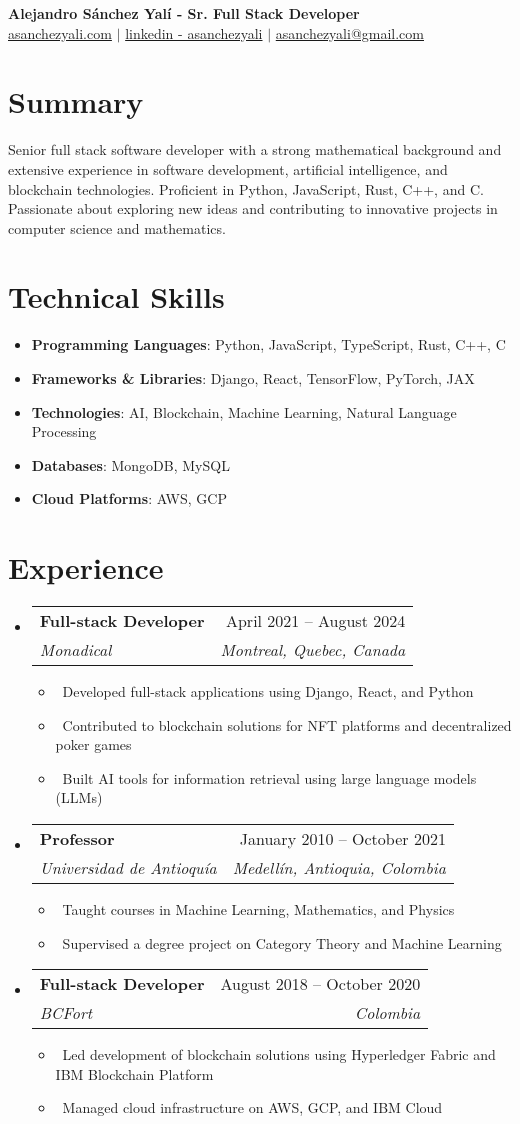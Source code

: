 \documentclass[letterpaper,10pt]{article}
\makeatletter
\newcommand{\resumeItem}[1]{\item\small{#1}}
\newcommand{\resumeSubheading}[4]{
\vspace{-1pt}\item
  \begin{tabular*}{0.97\textwidth}[t]{l@{\extracolsep{\fill}}r}
    \textbf{#1} & #2 \\
    \textit{#3} & \textit{#4} \\
  \end{tabular*}\vspace{-7pt}
}
\newcommand{\resumeSubHeadingList}{\begin{itemize}[leftmargin=0.15in, label={}]}
\newcommand{\resumeSubHeadingListEnd}{\end{itemize}}
\makeatother
\begin{document}
\begin{center}
  \textbf{\huge Alejandro Sánchez Yalí - Sr. Full Stack Developer} \\
  \href{https://asanchezyali.com}{asanchezyali.com} $|$ 
  \href{https://www.linkedin.com/in/asanchezyali}{linkedin - asanchezyali} $|$
  \small \href{mailto:asanchezyali@gmail.com}{asanchezyali@gmail.com} 
\end{center}

\section*{Summary}
Senior full stack software developer with a strong mathematical background and extensive experience in software development, artificial intelligence, and blockchain technologies. Proficient in Python, JavaScript, Rust, C++, and C. Passionate about exploring new ideas and contributing to innovative projects in computer science and mathematics.

\section{Technical Skills}
\resumeSubHeadingList
  \resumeItem{\textbf{Programming Languages}: Python, JavaScript, TypeScript, Rust, C++, C}
  \resumeItem{\textbf{Frameworks \& Libraries}: Django, React, TensorFlow, PyTorch, JAX}
  \resumeItem{\textbf{Technologies}: AI, Blockchain, Machine Learning, Natural Language Processing}
  \resumeItem{\textbf{Databases}: MongoDB, MySQL}
  \resumeItem{\textbf{Cloud Platforms}: AWS, GCP}
\resumeSubHeadingListEnd

\section{Experience}
\resumeSubHeadingList
  \resumeSubheading
      {Full-stack Developer}{April 2021 -- August 2024}
      {Monadical}{Montreal, Quebec, Canada}
      \resumeSubHeadingList
          \resumeItem{\textbullet\ Developed full-stack applications using Django, React, and Python}
          \resumeItem{\textbullet\ Contributed to blockchain solutions for NFT platforms and decentralized poker games}
          \resumeItem{\textbullet\ Built AI tools for information retrieval using large language models (LLMs)}
      \resumeSubHeadingListEnd
  \resumeSubheading
      {Professor}{January 2010 -- October 2021}
      {Universidad de Antioquía}{Medellín, Antioquia, Colombia}
      \resumeSubHeadingList
          \resumeItem{\textbullet\ Taught courses in Machine Learning, Mathematics, and Physics}
          \resumeItem{\textbullet\ Supervised a degree project on Category Theory and Machine Learning}
      \resumeSubHeadingListEnd
  \resumeSubheading
      {Full-stack Developer}{August 2018 -- October 2020}
      {BCFort}{Colombia}
      \resumeSubHeadingList
          \resumeItem{\textbullet\ Led development of blockchain solutions using Hyperledger Fabric and IBM Blockchain Platform}
          \resumeItem{\textbullet\ Managed cloud infrastructure on AWS, GCP, and IBM Cloud}
      \resumeSubHeadingListEnd
\resumeSubHeadingListEnd
\end{document}
